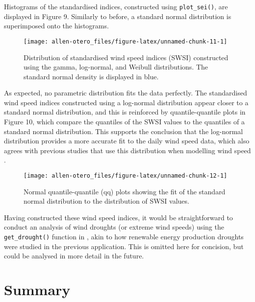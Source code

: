 Histograms of the standardised indices, constructed using \texttt{plot\_sei()}, are displayed in Figure 9. Similarly to before, a standard normal distribution is superimposed onto the histograms.

\begin{figure}

{\centering \texttt{[image: allen-otero\_files/figure-latex/unnamed-chunk-11-1]} 

}

\caption{Distribution of standardised wind speed indices (SWSI) constructed using the gamma, log-normal, and Weibull distributions. The standard normal density is displayed in blue.}\label{fig:unnamed-chunk-11}
\end{figure}

As expected, no parametric distribution fits the data perfectly. The standardised wind speed indices constructed using a log-normal distribution appear closer to a standard normal distribution, and this is reinforced by quantile-quantile plots in Figure 10, which compare the quantiles of the SWSI values to the quantiles of a standard normal distribution. This supports the conclusion that the log-normal distribution provides a more accurate fit to the daily wind speed data, which also agrees with previous studies that use this distribution when modelling wind speed \citep[e.g.][]{KolluEtAl2012,BaranLerch2015}.

\begin{figure}

{\centering \texttt{[image: allen-otero\_files/figure-latex/unnamed-chunk-12-1]} 

}

\caption{Normal quantile-quantile (qq) plots showing the fit of the standard normal distribution to the distribution of SWSI values.}\label{fig:unnamed-chunk-12}
\end{figure}

Having constructed these wind speed indices, it would be straightforward to conduct an analysis of wind droughts (or extreme wind speeds) using the \texttt{get\_drought()} function in , akin to how renewable energy production droughts were studied in the previous application. This is omitted here for concision, but could be analysed in more detail in the future.

\hypertarget{summary}{%
\section{Summary}\label{summary}}

